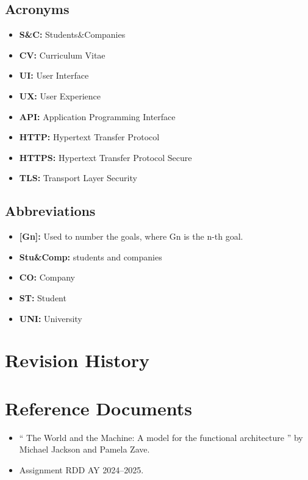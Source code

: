 \subsection{Acronyms}\label{subsec:acronyms}
\begin{itemize}
    \item \textbf{S\&C:} Students\&Companies
    \item \textbf{CV:} Curriculum Vitae
    \item \textbf{UI:} User Interface
    \item \textbf{UX:} User Experience
    \item \textbf{API:} Application Programming Interface
    \item \textbf{HTTP:} Hypertext Transfer Protocol
    \item \textbf{HTTPS:} Hypertext Transfer Protocol Secure
    \item \textbf{TLS:} Transport Layer Security

\end{itemize}

\subsection{Abbreviations}\label{subsec:abbreviations}
\begin{itemize}
    \item \textbf{[Gn]:} Used to number the goals, where Gn is the n-th goal.
    \item \textbf{Stu\&Comp:} students and companies
    \item \textbf{CO:} Company
    \item \textbf{ST:} Student
    \item \textbf{UNI:} University
\end{itemize}

\section{Revision History}\label{sec:revisionhistory}

\section{Reference Documents}\label{sec:reference}
\begin{itemize}
    \item `` The World and the Machine: A model for the functional architecture '' by Michael Jackson and Pamela Zave.
    \item Assignment RDD AY 2024–2025.
\end{itemize}

